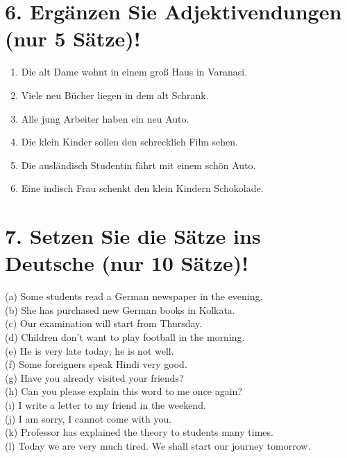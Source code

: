 \documentclass[a4paper,12pt]{article}
\begin{document}
\section*{6. Ergänzen Sie Adjektivendungen (nur 5 Sätze)!}

\begin{enumerate}[label=(\alph*)]
    \item Die alt\underline{\hspace{1cm}} Dame wohnt in einem groß\underline{\hspace{1cm}} Haus in Varanasi.
    \item Viele neu\underline{\hspace{1cm}} Bücher liegen in dem alt\underline{\hspace{1cm}} Schrank.
    \item Alle jung\underline{\hspace{1cm}} Arbeiter haben ein neu\underline{\hspace{1cm}} Auto.
    \item Die klein\underline{\hspace{1cm}} Kinder sollen den schrecklich\underline{\hspace{1cm}} Film sehen.
    \item Die ausländisch\underline{\hspace{1cm}} Studentin fährt mit einem schön\underline{\hspace{1cm}} Auto.
    \item Eine indisch\underline{\hspace{1cm}} Frau schenkt den klein\underline{\hspace{1cm}} Kindern Schokolade.
\end{enumerate}

\vspace{0.5cm}
\section*{7. Setzen Sie die Sätze ins Deutsche (nur 10 Sätze)!}

\noindent (a) Some students read a German newspaper in the evening.\\
(b) She has purchased new German books in Kolkata.\\
(c) Our examination will start from Thursday.\\
(d) Children don't want to play football in the morning.\\
(e) He is very late today; he is not well.\\
(f) Some foreigners speak Hindi very good.\\
(g) Have you already visited your friends?\\
(h) Can you please explain this word to me once again?\\
(i) I write a letter to my friend in the weekend.\\
(j) I am sorry, I cannot come with you.\\
(k) Professor has explained the theory to students many times.\\
(l) Today we are very much tired. We shall start our journey tomorrow.
\end{document}
